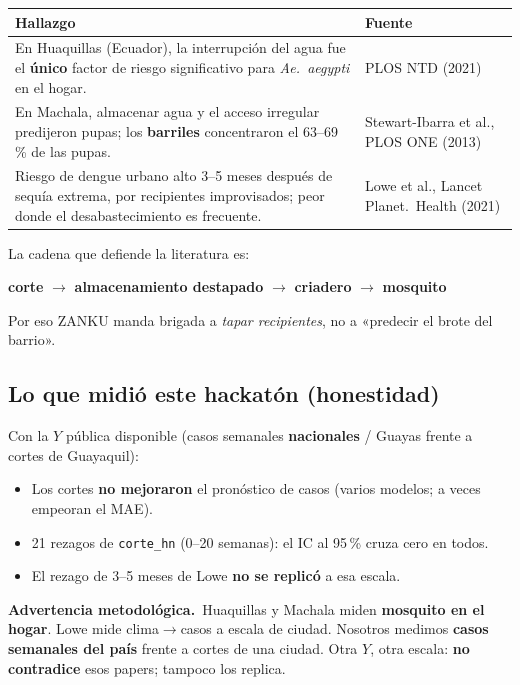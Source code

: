 \documentclass[11pt,a4paper]{article}
\newcommand{\nota}[2]{%
  \par\vspace{4pt}\noindent
  \colorbox{panelvs}{\parbox{\dimexpr\linewidth-2\fboxsep}{%
  \textbf{\color{azulvs}#1.}\ #2}}\par\vspace{4pt}}
\begin{document}
\begin{longtable}{@{}p{7.2cm}p{4.8cm}@{}}
\toprule
\textbf{Hallazgo} & \textbf{Fuente}\\
\midrule
\endhead
En Huaquillas (Ecuador), la interrupción del agua fue el \textbf{único}
factor de riesgo significativo para \textit{Ae.~aegypti} en el hogar. &
PLOS NTD (2021)\\
\addlinespace
En Machala, almacenar agua y el acceso irregular predijeron pupas; los
\textbf{barriles} concentraron el 63--69\,\% de las pupas. &
Stewart-Ibarra et al., PLOS ONE (2013)\\
\addlinespace
Riesgo de dengue urbano alto 3--5 meses después de sequía extrema, por
recipientes improvisados; peor donde el desabastecimiento es frecuente. &
Lowe et al., Lancet Planet.\ Health (2021)\\
\bottomrule
\end{longtable}

La cadena que defiende la literatura es:

\begin{center}
\textbf{corte} $\rightarrow$ \textbf{almacenamiento destapado}
$\rightarrow$ \textbf{criadero} $\rightarrow$ \textbf{mosquito}
\end{center}

Por eso ZANKU manda brigada a \emph{tapar recipientes}, no a «predecir
el brote del barrio».

\subsection{Lo que midió este hackatón (honestidad)}

Con la $Y$ pública disponible (casos semanales \textbf{nacionales} /
Guayas frente a cortes de Guayaquil):

\begin{itemize}[leftmargin=1.4em]
  \item Los cortes \textbf{no mejoraron} el pronóstico de casos
        (varios modelos; a veces empeoran el MAE).
  \item 21 rezagos de \texttt{corte\_hn} (0--20 semanas): el IC al
        95\,\% cruza cero en todos.
  \item El rezago de 3--5 meses de Lowe \textbf{no se replicó} a esa
        escala.
\end{itemize}

\nota{Advertencia metodológica}{Huaquillas y Machala miden
\textbf{mosquito en el hogar}. Lowe mide clima$\to$casos a escala de
ciudad. Nosotros medimos \textbf{casos semanales del país} frente a
cortes de una ciudad. Otra $Y$, otra escala: \textbf{no contradice}
esos papers; tampoco los replica.}
\end{document}

